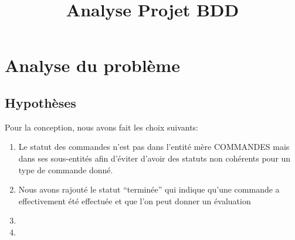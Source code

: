 \documentclass[10pt, a4paper]{article}
\title{Analyse Projet BDD}
\date{}
\begin{document}
\maketitle
\tableofcontents
\newpage

\section{Analyse du problème}
\subsection{Hypothèses}
Pour la conception, nous avons fait les choix suivants:
\begin{enumerate}
    \item Le statut des commandes n'est pas dans l'entité mère COMMANDES 
mais dans ses sous-entités afin d'éviter d'avoir des statuts non cohérents 
pour un type de commande donné.
    \item Nous avons rajouté le statut ``terminée'' qui indique qu'une 
commande a effectivement été effectuée et que l'on peut donner un 
évaluation
    \item %
    \item %
\end{enumerate}
\end{document}
